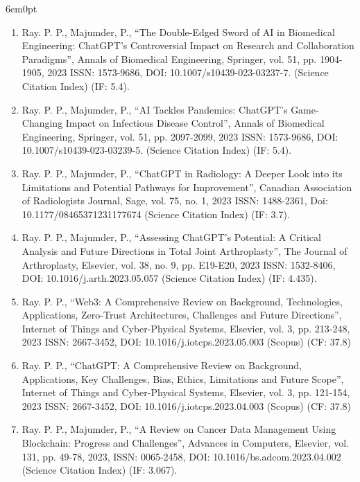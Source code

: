 \documentclass[11pt,a4paper]{moderncv}
\begin{document}
\begin{adjustwidth}{6em}{0pt}
\begin{enumerate}
		\item Ray. P. P., Majumder, P., “The Double-Edged Sword of AI in Biomedical Engineering: ChatGPT's Controversial Impact on Research and Collaboration Paradigms”, Annals of Biomedical Engineering, Springer, vol. 51, pp. 1904-1905, 2023 ISSN: 1573-9686, DOI: 10.1007/s10439-023-03237-7. (Science Citation Index) (IF: 5.4). 
		
		\item Ray. P. P., Majumder, P., “AI Tackles Pandemics: ChatGPT's Game-Changing Impact on Infectious Disease Control”, Annals of Biomedical Engineering, Springer, vol. 51, pp. 2097-2099, 2023 ISSN: 1573-9686, DOI: 10.1007/s10439-023-03239-5. (Science Citation Index) (IF: 5.4).
		
		\item Ray. P. P., Majumder, P., “ChatGPT in Radiology: A Deeper Look into its Limitations and Potential Pathways for Improvement”, Canadian Association of Radiologists Journal, Sage, vol. 75, no. 1, 2023 ISSN: 1488-2361, Doi: 10.1177/08465371231177674 (Science Citation Index) (IF: 3.7). 
		
		\item Ray. P. P., Majumder, P., “Assessing ChatGPT's Potential: A Critical Analysis and Future Directions in Total Joint Arthroplasty”, The Journal of Arthroplasty, Elsevier, vol. 38, no. 9, pp. E19-E20, 2023 ISSN: 1532-8406, DOI: 10.1016/j.arth.2023.05.057 (Science Citation Index) (IF: 4.435). 
		
		\item Ray. P. P., “Web3: A Comprehensive Review on Background, Technologies, Applications, Zero-Trust Architectures, Challenges and Future Directions”, Internet of Things and Cyber-Physical Systems, Elsevier, vol. 3, pp. 213-248, 2023 ISSN: 2667-3452, DOI: 10.1016/j.iotcps.2023.05.003 (Scopus) (CF: 37.8)
		
		\item Ray. P. P., “ChatGPT: A Comprehensive Review on Background, Applications, Key Challenges, Bias, Ethics, Limitations and Future Scope”, Internet of Things and Cyber-Physical Systems, Elsevier, vol. 3, pp. 121-154, 2023 ISSN: 2667-3452, DOI: 10.1016/j.iotcps.2023.04.003 (Scopus) (CF: 37.8)
		
		\item Ray. P. P., Majumder, P., “A Review on Cancer Data Management Using Blockchain: Progress and Challenges”, Advances in Computers, Elsevier, vol. 131, pp. 49-78, 2023, ISSN: 0065-2458, DOI: 10.1016/bs.adcom.2023.04.002 (Science Citation Index) (IF: 3.067).
		

\end{enumerate}
\end{adjustwidth}
\end{document}
